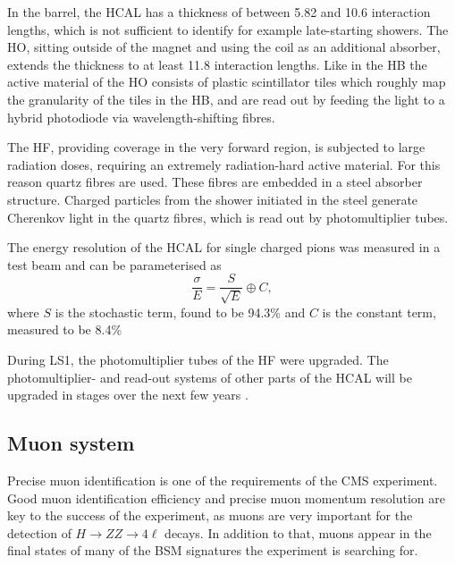 In the barrel, the \ac{HCAL}
has a thickness of between 5.82 and 10.6 interaction lengths, which is not 
sufficient to identify for example late-starting showers. The \ac{HO}, sitting
outside of the magnet and using the coil as an additional absorber, extends the 
thickness to at least 11.8 interaction lengths. 
Like in the \ac{HB} the active material of the \ac{HO} consists of plastic scintillator tiles which roughly
map the granularity of the tiles in the \ac{HB}, and are read out by feeding the light
to a hybrid photodiode via wavelength-shifting fibres.

The \ac{HF}, providing coverage in the very forward region, is 
subjected to large radiation doses, requiring an extremely
radiation-hard active material. For this reason quartz
fibres are used. These fibres are embedded
in a steel absorber structure. Charged particles from the
shower initiated in the steel generate Cherenkov light in 
the quartz fibres, which is read out by photomultiplier tubes.

The energy resolution of the \ac{HCAL} for single charged pions 
was measured in a test beam \cite{cms-hcalecal}
and can be parameterised as 
\begin{equation}\label{eqn:hcal_res}
\frac{\sigma}{E} = \frac{S}{\sqrt{E}} \oplus C,
\end{equation}
where $S$ is the stochastic term, found to be 94.3\% %
and $C$ is the constant term, measured to be 8.4\% %

During \ac{LS1}, the photomultiplier tubes of the \ac{HF} were upgraded. The photomultiplier- and
read-out systems of other parts of the \ac{HCAL} will be upgraded in stages over the
next few years \cite{cms-hcal-upgrade}.


\subsection{Muon system}
\label{sec:CMSLHC_CMS_muons}
Precise muon identification is one of the requirements of the \ac{CMS} 
experiment. Good muon identification efficiency and precise muon momentum 
resolution are key to the success of the experiment, as muons are
very important for the detection of $H\rightarrow ZZ \rightarrow 4\ell$ decays. In addition to that,
muons appear in the final states of many of the \ac{BSM} signatures the experiment is searching for.

